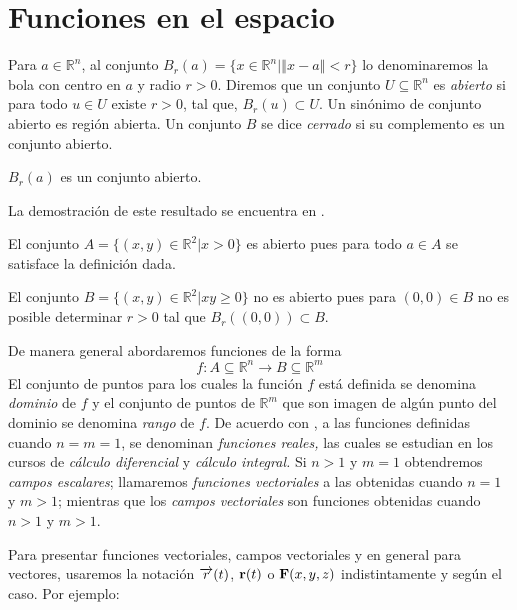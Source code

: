 \section{Funciones en el espacio} \label{funcionesenelespacio}
Para $a\in \mathbb{R}^{n}$, al conjunto $B_{r}\left(a\right) =\{x\in \mathbb{R}^{n}|\left\Vert x-a\right\Vert <r\}$
lo denominaremos la bola con centro en $a$ y radio $r>0$. 
Diremos que un conjunto $U\subseteq \mathbb{R}^{n}$ es \emph{abierto} si para todo $u\in U$
existe $r>0$, tal que, $B_{r}(u) \subset U$.  
Un sinónimo de conjunto abierto es región abierta. 
Un conjunto $B$ se dice \emph{cerrado} si su complemento es un conjunto abierto. 
\begin{teorema}
  $B_{r}(a)$ es un conjunto abierto.
\end{teorema}
La demostración de este resultado se encuentra en \textcite{marsden_calculo_2013}.
\begin{ejemplo}
  El conjunto $A=\{(x,y) \in \mathbb{R}^{2}|x>0\}$ es abierto pues
  para todo $a \in A$ se satisface la definición dada.

  El conjunto $B=\{(x,y) \in \mathbb{R}^{2}|xy\geq 0\}$ no es abierto pues
  para $\left( 0,0\right) \in B$ no es posible determinar
  $r>0$ tal que $B_{r}\left( \left( 0,0\right) \right) \subset B$.
\end{ejemplo}
De manera general abordaremos funciones de la forma
\begin{equation}
  f: A\subseteq \mathbb{R}^n \to B\subseteq \mathbb{R}^m
\end{equation}
El conjunto de puntos para los cuales la función $f$ está definida se denomina \emph{dominio} de $f$
y el conjunto de puntos de $\mathbb{R}^m$ que son imagen de algún punto del dominio se denomina \emph{rango}
de $f$. De acuerdo con \cite{apostol_calculus_1999}, a las funciones definidas cuando $n=m=1$, se denominan \emph{funciones reales,} las cuales se estudian en los cursos de \emph{cálculo diferencial} y \emph{cálculo integral.}
Si $n>1$ y $m=1$ obtendremos \emph{campos escalares};   
llamaremos \emph{funciones vectoriales} a las obtenidas cuando $n=1$ y $m>1$; mientras que los \emph{campos vectoriales} son funciones obtenidas cuando $n>1$ y $m>1$. 

Para presentar funciones vectoriales, campos vectoriales y en general para vectores, usaremos la notación $\overrightarrow{r}(t)$, ${\bf r}(t)$ o ${\bf F}(x,y,z)$ indistintamente y según el caso.
Por ejemplo:

